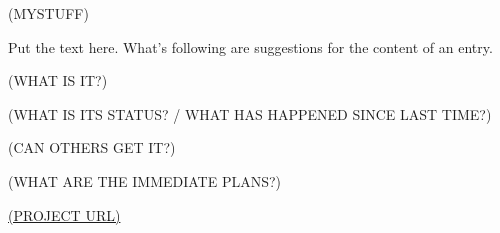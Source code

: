 \documentclass{article}
\begin{document}
\begin{hcarentry}{(MYSTUFF)}
\makeheader

Put the text here. What's following are suggestions for the content of an entry.

(WHAT IS IT?)

(WHAT IS ITS STATUS? / WHAT HAS HAPPENED SINCE LAST TIME?)

(CAN OTHERS GET IT?)

(WHAT ARE THE IMMEDIATE PLANS?)

\FurtherReading
  \url{(PROJECT URL)}
\end{hcarentry}
\end{document}
